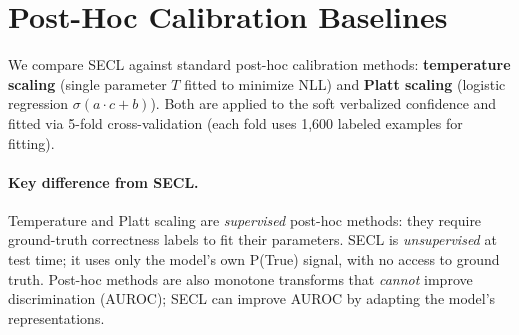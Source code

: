 \begin{table}[htbp]
\centering
\small
{}
\caption{Llama~3.2-3B multi-seed robustness (seeds 42, 43, 44). SECL remains strongly better calibrated than the verbalized baseline across seeds and also improves AUROC on this model.}
\label{tab:llama_multiseed}
\end{table}

\section{Post-Hoc Calibration Baselines} \label{app:posthoc}

We compare SECL against standard post-hoc calibration methods:
\textbf{temperature scaling} \citep{guo_calibration_2017} (single parameter $T$
fitted to minimize NLL) and \textbf{Platt scaling} \citep{platt_probabilistic_1999}
(logistic regression $\sigma(a \cdot c + b)$).
Both are applied to the soft verbalized confidence and fitted via 5-fold 
cross-validation (each fold uses 1{,}600 labeled examples for fitting).

\paragraph{Key difference from SECL.}
Temperature and Platt scaling are \emph{supervised} post-hoc methods:
they require ground-truth correctness labels to fit their parameters.
SECL is \emph{unsupervised} at test time; it uses only the model's own 
P(True) signal, with no access to ground truth.
Post-hoc methods are also monotone transforms that 
\emph{cannot} improve discrimination (AUROC);
SECL can improve AUROC by adapting the model's representations.

